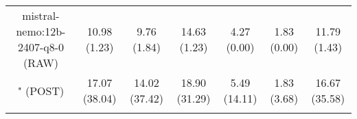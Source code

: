 \begin{table}[]
{\begin{tabular}{ccccccc}
        \multicolumn{1}{c|}{mistral-nemo:12b-2407-q8-0 (RAW)} & 10.98 (1.23) & 9.76 (1.84) & \multicolumn{1}{c|}{14.63 (1.23)} & 4.27 (0.00) & \multicolumn{1}{c|}{1.83 (0.00)} & 11.79 (1.43) \\
        
        

        \multicolumn{1}{c|}{" (POST)} & 17.07 (38.04) & 14.02 (37.42) & \multicolumn{1}{c|}{18.90 (31.29)} & 5.49 (14.11) & \multicolumn{1}{c|}{1.83 (3.68)} & 16.67 (35.58) \\
        \cline{1-7}
        
\\ \hline
\end{tabular}%
}
\end{table}
    